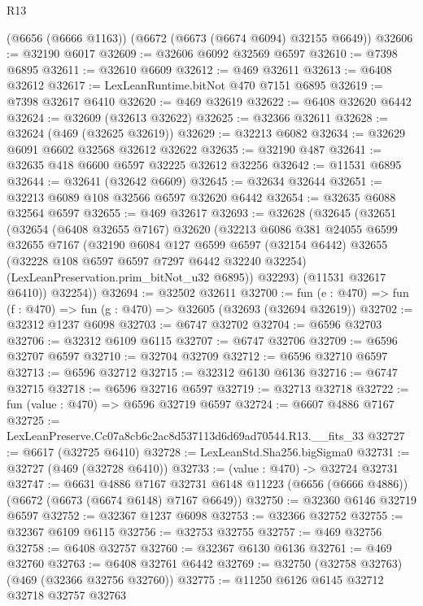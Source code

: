 \begin{lexlean}{R13}
\begin{coremodule}
    (@6656 (@6666 @1163))
    (@6672 (@6673 (@6674 @6094) @32155 @6649))
@32606 := @32190 @6017
@32609 := @32606 @6092 @32569 @6597
@32610 := @7398 @6895
@32611 := @32610 @6609
@32612 := @469 @32611
@32613 := @6408 @32612
@32617 := LexLeanRuntime.bitNot @470 @7151 @6895
@32619 := @7398 @32617 @6410
@32620 := @469 @32619
@32622 := @6408 @32620 @6442
@32624 := @32609 (@32613 @32622)
@32625 := @32366 @32611
@32628 := @32624 (@469 (@32625 @32619))
@32629 := @32213 @6082
@32634 := @32629 @6091 @6602 @32568 @32612 @32622
@32635 := @32190 @487
@32641 := @32635 @418 @6600 @6597 @32225 @32612 @32256
@32642 := @11531 @6895
@32644 := @32641 (@32642 @6609)
@32645 := @32634 @32644
@32651 := @32213 @6089 @108 @32566 @6597 @32620 @6442
@32654 := @32635 @6088 @32564 @6597
@32655 := @469 @32617
@32693 := @32628
    (@32645
      (@32651
        (@32654
          (@6408 @32655 @7167)
          @32620
          (@32213
            @6086
            @381
            @24055
            @6599
            @32655
            @7167
            (@32190
              @6084
              @127
              @6599
              @6597
              (@32154 @6442)
              @32655
              (@32228 @108 @6597 @6597 @7297 @6442 @32240 @32254)
              (LexLeanPreservation.prim_bitNot_u32 @6895))
            @32293)
          (@11531 @32617 @6410))
        @32254))
@32694 := @32502 @32611
@32700 := fun (e : @470) => fun (f : @470) => fun (g : @470) => @32605 (@32693 (@32694 @32619))
@32702 := @32312 @1237 @6098
@32703 := @6747 @32702
@32704 := @6596 @32703
@32706 := @32312 @6109 @6115
@32707 := @6747 @32706
@32709 := @6596 @32707 @6597
@32710 := @32704 @32709
@32712 := @6596 @32710 @6597
@32713 := @6596 @32712
@32715 := @32312 @6130 @6136
@32716 := @6747 @32715
@32718 := @6596 @32716 @6597
@32719 := @32713 @32718
@32722 := fun (value : @470) => @6596 @32719 @6597
@32724 := @6607 @4886 @7167
@32725 := LexLeanPreserve.Cc07a8cb6c2ac8d537113d6d69ad70544.R13.__fits_33
@32727 := @6617 (@32725 @6410)
@32728 := LexLeanStd.Sha256.bigSigma0
@32731 := @32727 (@469 (@32728 @6410))
@32733 := (value : @470) -> @32724 @32731
@32747 := @6631
    @4886
    @7167
    @32731
    @6148
    @11223
    (@6656 (@6666 @4886))
    (@6672 (@6673 (@6674 @6148) @7167 @6649))
@32750 := @32360 @6146 @32719 @6597
@32752 := @32367 @1237 @6098
@32753 := @32366 @32752
@32755 := @32367 @6109 @6115
@32756 := @32753 @32755
@32757 := @469 @32756
@32758 := @6408 @32757
@32760 := @32367 @6130 @6136
@32761 := @469 @32760
@32763 := @6408 @32761 @6442
@32769 := @32750 (@32758 @32763) (@469 (@32366 @32756 @32760))
@32775 := @11250 @6126 @6145 @32712 @32718 @32757 @32763

\end{coremodule}
\end{lexlean}
